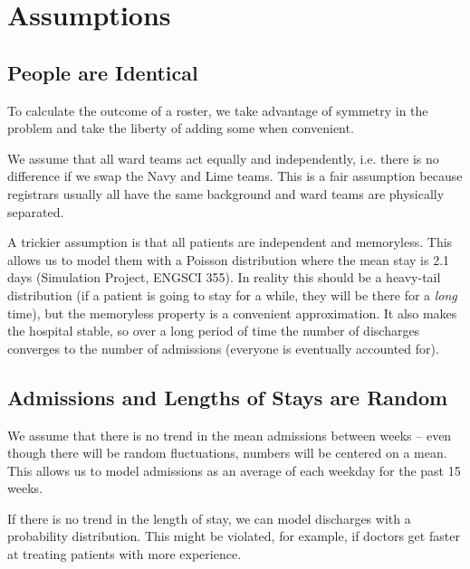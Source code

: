 \documentclass[a4paper]{article}
\begin{document}
\section{Assumptions}
\begin{multicols}{2}
\subsection{People are Identical}

To calculate the outcome of a roster, we take advantage of symmetry in the problem and take the liberty of adding some when convenient.

We assume that all ward teams act equally and independently, i.e. there is no difference if we swap the Navy and Lime teams. This is a fair assumption because registrars usually all have the same background and ward teams are physically separated.

A trickier assumption is that all patients are independent and memoryless. This allows us to model them with a Poisson distribution where the mean stay is 2.1 days (Simulation Project, ENGSCI 355).
In reality this should be a heavy-tail distribution (if a patient is going to stay for a while, they will be there for a \emph{long} time), but the memoryless property is a convenient approximation. It also makes the hospital stable, so over a long period of time the number of discharges converges to the number of admissions (everyone is eventually accounted for).

\subsection{Admissions and Lengths of Stays are Random}

We assume that there is no trend in the mean admissions between weeks -- even though there will be random fluctuations, numbers will be centered on a mean. This allows us to model admissions as an average of each weekday for the past 15 weeks.

If there is no trend in the length of stay, we can model discharges with a probability distribution. This might be violated, for example, if doctors get faster at treating patients with more experience.

\end{multicols}
\end{document}
